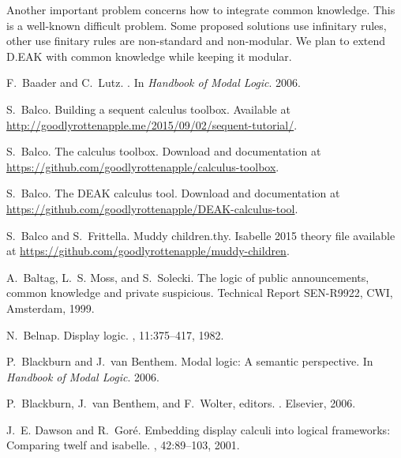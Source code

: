 \documentclass[runningheads,a4paper]{llncs}
\begin{document}
\medskip Another important problem concerns how to integrate common knowledge. 
This is a well-known difficult problem. Some proposed solutions use infinitary rules, other use finitary rules are non-standard and non-modular. We plan to extend D.EAK with common knowledge while keeping it modular.



\newpage



\begin{thebibliography}{10}

F.~Baader and C.~Lutz.
.
\newblock In {\em Handbook of Modal Logic}. 2006.

S.~Balco.
\newblock Building a sequent calculus toolbox.
\newblock Available at
  \url{http://goodlyrottenapple.me/2015/09/02/sequent-tutorial/}.

S.~Balco.
\newblock The calculus toolbox.
\newblock Download and documentation at
  \url{https://github.com/goodlyrottenapple/calculus-toolbox}.

S.~Balco.
\newblock The {DEAK} calculus tool.
\newblock Download and documentation at
  \url{https://github.com/goodlyrottenapple/DEAK-calculus-tool}.

S.~Balco and S.~Frittella.
\newblock Muddy children.thy.
\newblock Isabelle 2015 theory file available at
  \url{https://github.com/goodlyrottenapple/muddy-children}.

A.~Baltag, L.~S. Moss, and S.~Solecki.
\newblock The logic of public announcements, common knowledge and private
  suspicious.
\newblock Technical Report SEN-R9922, CWI, Amsterdam, 1999.

N.~Belnap.
\newblock Display logic.
, 11:375--417, 1982.

P.~Blackburn and J.~van Benthem.
\newblock Modal logic: A semantic perspective.
\newblock In {\em Handbook of Modal Logic}. 2006.

P.~Blackburn, J.~van Benthem, and F.~Wolter, editors.
.
\newblock Elsevier, 2006.

J.~E. Dawson and R.~Gor{\'{e}}.
\newblock Embedding display calculi into logical frameworks: Comparing twelf
  and isabelle.
, 42:89--103, 2001.


\end{thebibliography}
\end{document}
